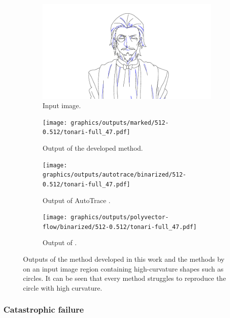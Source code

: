 \begin{figure}
    \centering
    \begin{subfigure}{.45\textwidth}
        \includegraphics[width=\textwidth,trim={15.5em 11.5em 15.5em 6em},clip]{graphics/outputs/ground-truth/tonari-full_47.pdf}
        \caption{Input image.}
    \end{subfigure}
    \begin{subfigure}{.45\textwidth}
        \texttt{[image: graphics/outputs/marked/512-0.512/tonari-full\_47.pdf]}
        \caption{Output of the developed method.}
    \end{subfigure}
    \begin{subfigure}{.45\textwidth}
        \texttt{[image: graphics/outputs/autotrace/binarized/512-0.512/tonari-full\_47.pdf]}
        \caption{Output of AutoTrace \citep{autotrace}.}
    \end{subfigure}
    \begin{subfigure}{.45\textwidth}
        \texttt{[image: graphics/outputs/polyvector-flow/binarized/512-0.512/tonari-full\_47.pdf]}
        \caption{Output of \cite{Puhachov2021KeypointPolyvector}.}
    \end{subfigure}
    \caption{Outputs of the method developed in this work and the methods by \citet{autotrace,Puhachov2021KeypointPolyvector} on an input image region containing high-curvature shapes such as circles. It can be seen that every method struggles to reproduce the circle with high curvature.}
    \label{fig:tonari-full_47.eye.zoom}
\end{figure}

\subsubsection{Catastrophic failure}
\label{subsec:catastrophy}

